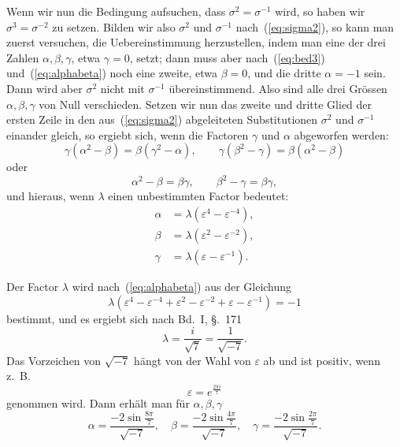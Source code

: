 \documentclass[12pt,a4paper]{article}
\begin{document}
Wenn wir nun die Bedingung aufsuchen, dass $\sigma^2 = \sigma^{-1}$ wird, so haben wir $\sigma^3 = \sigma^{-2}$ zu setzen. Bilden wir also $\sigma^2$ und $\sigma^{-1}$ nach~(\ref{eq:sigma2}), so kann man zuerst versuchen, die Uebereinstimmung herzustellen, indem man eine der drei Zahlen $\alpha, \beta, \gamma$, etwa $\gamma = 0$, setzt; dann muss aber nach~(\ref{eq:bed3}) und~(\ref{eq:alphabeta}) noch eine zweite, etwa $\beta = 0$, und die dritte $\alpha = -1$ sein. Dann wird aber $\sigma^2$ nicht mit $\sigma^{-1}$ \"ubereinstimmend. Also sind alle drei Gr\"ossen $\alpha, \beta, \gamma$ von Null verschieden. Setzen wir nun das zweite und dritte Glied der ersten Zeile in den aus~(\ref{eq:sigma2}) abgeleiteten Substitutionen $\sigma^2$ und $\sigma^{-1}$ einander gleich, so ergiebt sich, wenn die Factoren $\gamma$ und $\alpha$ abgeworfen werden:
\[\gamma(\alpha^2 - \beta) = \beta(\gamma^2 - \alpha), \qquad \gamma(\beta^2 - \gamma) = \beta(\alpha^2 - \beta)\]
oder
\[\alpha^2 - \beta = \beta\gamma, \qquad \beta^2 - \gamma = \beta\gamma,\]
und hieraus, wenn $\lambda$ einen unbestimmten Factor bedeutet:
\begin{align}
\label{eq:alphaval} \alpha &= \lambda(\varepsilon^4 - \varepsilon^{-4}),\\
\beta &= \lambda(\varepsilon^2 - \varepsilon^{-2}),\nonumber\\
\gamma &= \lambda(\varepsilon - \varepsilon^{-1}).\nonumber
\end{align}

Der Factor $\lambda$ wird nach~(\ref{eq:alphabeta}) aus der Gleichung
\begin{equation}
\label{eq:lambda} \lambda(\varepsilon^4 - \varepsilon^{-4} + \varepsilon^2 - \varepsilon^{-2} + \varepsilon - \varepsilon^{-1}) = -1
\end{equation}
bestimmt, und es ergiebt sich nach Bd.~I, \S.~171
\begin{equation}
\label{eq:lambdaval} \lambda = \frac{i}{\sqrt{7}} = \frac{1}{\sqrt{-7}}.
\end{equation}
Das Vorzeichen von $\sqrt{-7}$ h\"angt von der Wahl von $\varepsilon$ ab und ist positiv, wenn z.~B.
\[\varepsilon = e^{\frac{2\pi i}{7}}\]
genommen wird. Dann erh\"alt man f\"ur $\alpha, \beta, \gamma$
\begin{equation}
\label{eq:abcval} \alpha = \frac{-2\sin\frac{8\pi}{7}}{\sqrt{-7}}, \quad \beta = \frac{-2\sin\frac{4\pi}{7}}{\sqrt{-7}}, \quad \gamma = \frac{-2\sin\frac{2\pi}{7}}{\sqrt{-7}}.
\end{equation}
\end{document}
